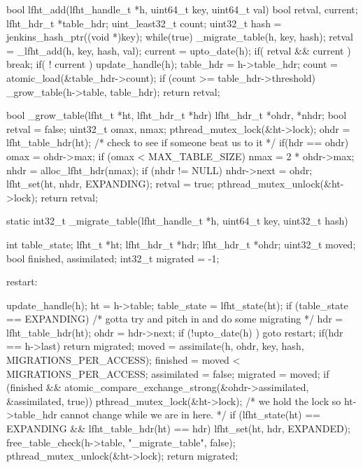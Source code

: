 \begin{center}
\begin{clisting}
bool lfht_add(lfht_handle_t *h, uint64_t key, uint64_t val){
  bool retval, current;
  lfht_hdr_t *table_hdr;
  uint_least32_t count;
  uint32_t hash = jenkins_hash_ptr((void *)key);
  while(true){
    _migrate_table(h, key, hash);
    retval = _lfht_add(h, key, hash, val);
    current = upto_date(h);
    if( retval && current ){ break; }
    if( ! current ){ update_handle(h); }
  }
  table_hdr = h->table_hdr;
  count = atomic_load(&table_hdr->count);
  if (count >= table_hdr->threshold){
    _grow_table(h->table, table_hdr);
  }
  return retval;
}

\end{clisting}
\end{center}




\begin{center}
\begin{clisting}
bool _grow_table(lfht_t *ht,  lfht_hdr_t *hdr){
  lfht_hdr_t *ohdr, *nhdr;
  bool retval = false;
  uint32_t omax, nmax;
  pthread_mutex_lock(&ht->lock);
  ohdr = lfht_table_hdr(ht);
  /* check to see if someone beat us to it */
  if(hdr == ohdr){
    omax = ohdr->max;
    if (omax < MAX_TABLE_SIZE) {
      nmax = 2 * ohdr->max;
      nhdr  = alloc_lfht_hdr(nmax);
      if (nhdr != NULL){
	nhdr->next = ohdr;
	lfht_set(ht, nhdr, EXPANDING);
	retval = true;
      }
    }
  }
  pthread_mutex_unlock(&ht->lock);
  return retval;
}

\end{clisting}
\end{center}

\begin{center}
\begin{clisting}
static int32_t _migrate_table(lfht_handle_t *h, uint64_t key, uint32_t hash){
  int table_state;
  lfht_t *ht;
  lfht_hdr_t *hdr;
  lfht_hdr_t *ohdr;
  uint32_t moved;
  bool finished, assimilated;
  int32_t migrated = -1;
  
 restart:

  update_handle(h);
  ht = h->table;
  table_state = lfht_state(ht);
  if (table_state == EXPANDING){
    /* gotta try and pitch in and do some migrating */
    hdr = lfht_table_hdr(ht);
    ohdr = hdr->next;
    if (!upto_date(h) ){ goto restart; }
    if(hdr == h->last){ return migrated; }
    moved = assimilate(h, ohdr, key, hash,  MIGRATIONS_PER_ACCESS);
    finished = moved < MIGRATIONS_PER_ACCESS;
    assimilated = false;
    migrated = moved;
    if (finished  &&  atomic_compare_exchange_strong(&ohdr->assimilated, &assimilated, true)){
      pthread_mutex_lock(&ht->lock);
      /* we hold the lock so ht->table_hdr cannot change while we are in here. */
      if (lfht_state(ht) == EXPANDING  && lfht_table_hdr(ht) == hdr){
	lfht_set(ht, hdr, EXPANDED);
        free_table_check(h->table, "_migrate_table", false);
      }
      pthread_mutex_unlock(&ht->lock);
    }
  }
  return migrated;
}
\end{clisting}
\end{center}

